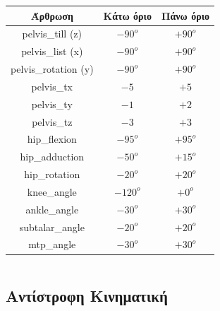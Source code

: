 \documentclass[8pt,sans,mathserif]{beamer}%
\newcommand{\eng}[1]{\selectlanguage{english}#1\selectlanguage{greek}}
\begin{document}
\begin{frame}
\begin{columns}
        \pause

        \begin{tabular}{ccc}
            \toprule
            Άρθρωση & Κάτω όριο & Πάνω όριο\\
            \midrule
            \eng{pelvis\_till (z)} & $-90^{o}$ & $+90^{o}$\\
            \eng{pelvis\_list (x)} & $-90^{o}$ & $+90^{o}$\\
            \eng{pelvis\_rotation (y)} & $-90^{o}$ & $+90^{o}$\\
            \eng{pelvis\_tx} & $-5$ & $+5$\\
            \eng{pelvis\_ty} & $-1$ & $+2$\\
            \eng{pelvis\_tz} & $-3$ & $+3$\\
            \eng{hip\_flexion} & $-95^{o}$ & $+95^{o}$\\
            \eng{hip\_adduction} & $-50^{o}$ & $+15^{o}$\\
            \eng{hip\_rotation} & $-20^{o}$ & $+20^{o}$\\
            \eng{knee\_angle} & $-120^{o}$ & $+0^{o}$\\
            \eng{ankle\_angle} & $-30^{o}$ & $+30^{o}$\\
            \eng{subtalar\_angle} & $-20^{o}$ & $+20^{o}$\\
            \eng{mtp\_angle} & $-30^{o}$ & $+30^{o}$\\
            \bottomrule
        \end{tabular}
    \end{columns}

\end{frame}

\subsection{Αντίστροφη Κινηματική}
\end{document}

